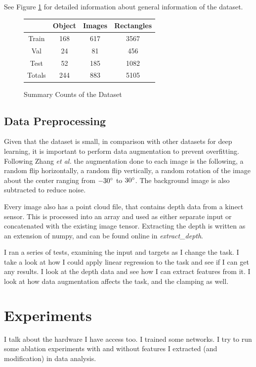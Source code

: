 \documentclass{article}
\begin{document}
See Figure \ref{fig:summary} for detailed information about general
information of the dataset.

\begin{figure}
\centering
\begin{tabular}{c|c|c|c|}
&Object&Images&Rectangles\\
\hline
Train&168&617&3567\\
\hline
Val&24&81&456\\
\hline
Test&52&185&1082\\
\hline
Totals&244&883&5105\\
\hline
\end{tabular}
\caption{Summary Counts of the Dataset}
\label{fig:summary}
\end{figure}




\subsection{Data Preprocessing}
Given that the dataset is small, in comparison with other datasets for deep
learning, it is important to perform data augmentation to prevent overfitting.
Following Zhang \textit{et al.} \cite{zhang18} the augmentation done to each
image is the following, a random flip horizontally, a random flip vertically,
a random rotation of the image about the center ranging from $-30\degree$ to
$30\degree$. The background image is also subtracted to reduce noise.

Every image also has a point cloud file, that contains depth data from a kinect
sensor. This is processed into an array and used as either separate input or
concatenated with the existing image tensor. Extracting the depth is written as an
extension of numpy, and can be found online in \textit{extract\_depth}.

I ran a series of tests, examining the input and targets as I change the task.
I take a look at how I could apply linear regression to the task and see if
I can get any results. I look at the depth data and see how I can extract
features from it. I look at how data augmentation affects the task, and the
clamping as well.

\section{Experiments}
I talk about the hardware I have access too. I trained some networks. I try
to run some ablation experiments with and without features I extracted (and
modification) in data analysis.


\end{document}
